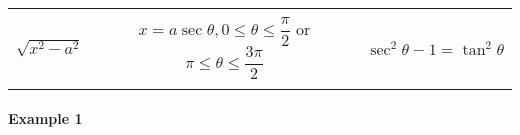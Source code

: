 \documentclass[
]{article}
\begin{document}
\begin{longtable}[]{@{}ccc@{}}
\begin{minipage}[t]{0.30\columnwidth}
\strut
\end{minipage} & \begin{minipage}[t]{0.30\columnwidth}\centering
\strut
\end{minipage} & \begin{minipage}[t]{0.30\columnwidth}\centering
\strut
\end{minipage}\tabularnewline
\begin{minipage}[t]{0.30\columnwidth}\centering
\(\sqrt{x^2-a^2}\)\strut
\end{minipage} & \begin{minipage}[t]{0.30\columnwidth}\centering
\(x = a \sec \theta, 0 \leq \theta \leq \dfrac{\pi}{2}\) or
\(\pi \leq \theta \leq \dfrac{3\pi}{2}\)\strut
\end{minipage} & \begin{minipage}[t]{0.30\columnwidth}\centering
\(\sec^2 \theta - 1 = \tan^2 \theta\)\strut
\end{minipage}\tabularnewline
\begin{minipage}[t]{0.30\columnwidth}\centering
\strut
\end{minipage} & \begin{minipage}[t]{0.30\columnwidth}\centering
\strut
\end{minipage} & \begin{minipage}[t]{0.30\columnwidth}\centering
\strut
\end{minipage}\tabularnewline
\bottomrule
\end{longtable}

\hypertarget{example-1-7}{%
\paragraph*{Example 1}\label{example-1-7}}
\end{document}
